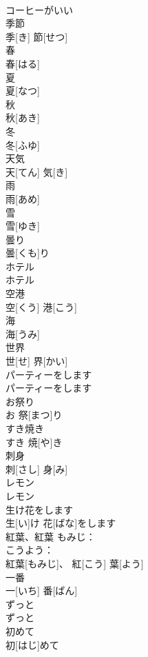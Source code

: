 \documentclass[8pt]{extreport}
\begin{document}
\begin{CJK}{UTF8}{min}
\\	コーヒーがいい		
\\	季節	
\\	季[き] 節[せつ]		
\\	春	
\\	春[はる]		
\\	夏	
\\	夏[なつ]		
\\	秋	
\\	秋[あき]		
\\	冬	
\\	冬[ふゆ]		
\\	天気	
\\	天[てん] 気[き]		
\\	雨	
\\	雨[あめ]		
\\	雪	
\\	雪[ゆき]		
\\	曇り	
\\	曇[くも]り		
\\	ホテル	
\\	ホテル		
\\	空港	
\\	空[くう] 港[こう]		
\\	海	
\\	海[うみ]		
\\	世界	
\\	世[せ] 界[かい]		
\\	パーティーをします	
\\	パーティーをします		
\\	お祭り	
\\	お 祭[まつ]り		
\\	すき焼き	
\\	すき 焼[や]き		
\\	刺身	
\\	刺[さし] 身[み]		
\\	レモン	
\\	レモン		
\\	生け花をします	
\\	生[い]け 花[ばな]をします		
\\	紅葉、紅葉	もみじ：
\\	こうよう：
\\	紅葉[もみじ]、 紅[こう] 葉[よう]		
\\	一番	
\\	一[いち] 番[ばん]		
\\	ずっと	
\\	ずっと		
\\	初めて	
\\	初[はじ]めて		

\end{CJK}
\end{document}
